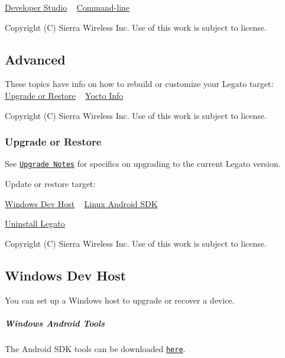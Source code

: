 \hyperlink{getstartedDSinstall}{Developer Studio} ~\newline
 \hyperlink{getstartedCLinstallMain}{Command-\/line}





Copyright (C) Sierra Wireless Inc. Use of this work is subject to license. \hypertarget{getstartedAdvanced}{}\subsection{Advanced}\label{getstartedAdvanced}
These topics have info on how to rebuild or customize your Legato target\+: ~\newline
 \hyperlink{getstartedRestoreUpgrade}{Upgrade or Restore} ~\newline
 \hyperlink{yoctoMain}{Yocto Info}





Copyright (C) Sierra Wireless Inc. Use of this work is subject to license. \hypertarget{getstartedRestoreUpgrade}{}\subsubsection{Upgrade or Restore}\label{getstartedRestoreUpgrade}
See \href{http://www.legato.io/legato-docs/15_10/legatoUpgrade15_10.html}{\tt Upgrade Notes} for specifics on upgrading to the current Legato version.

Update or restore target\+:

\hyperlink{getstartedWindowsHost}{Windows Dev Host} ~\newline
 \hyperlink{getstartedLinuxAndroid}{Linux Android S\+D\+K} ~\newline


\hyperlink{getstartedUninstall}{Uninstall Legato}





Copyright (C) Sierra Wireless Inc. Use of this work is subject to license. \hypertarget{getstartedWindowsHost}{}\subsection{Windows Dev Host}\label{getstartedWindowsHost}
You can set up a Windows host to upgrade or recover a device.\hypertarget{getstarted_windows_host_getstartedWindowsHost_instAndroidtools}{}\subparagraph{Windows Android Tools}\label{getstarted_windows_host_getstartedWindowsHost_instAndroidtools}
The Android S\+D\+K tools can be downloaded \href{http://developer.android.com/sdk/index.html}{\tt here}.

